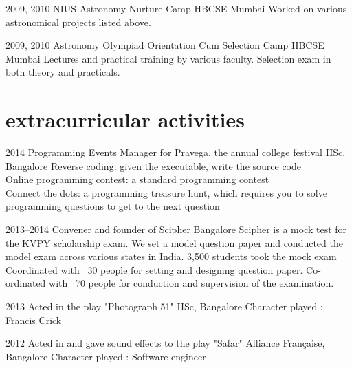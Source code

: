 \documentclass[11pt]{friggeri-cv}
\begin{document}
\begin{entrylist}
  \entryy
    {2009, 2010}
    {NIUS Astronomy Nurture Camp}
    {HBCSE Mumbai}
    {Worked on various astronomical projects listed above.}
\end{entrylist}



\begin{entrylist}
  \entryy
    {2009, 2010}
    {Astronomy Olympiad Orientation Cum Selection Camp}
    {HBCSE Mumbai}
    {Lectures and practical training by various faculty. Selection exam in both theory and practicals.}
\end{entrylist}
\pagebreak
\section{extracurricular activities}

\begin{entrylist}
  \entryy
    {2014}
    {Programming Events Manager for Pravega, the annual college festival}
    {IISc, Bangalore}
    {Reverse coding: given the executable, write the source code \\ Online programming contest: a standard programming contest\\ Connect the dots: a programming treasure hunt, which requires you to solve programming questions to get to the next question}
\end{entrylist}

\begin{entrylist}
  \entryy
    {2013--2014}
    {Convener and founder of Scipher}
    {Bangalore}
    {Scipher is a mock test for the KVPY scholarship exam. We set a model question paper and conducted the model exam across various states in India. 3,500 students took the mock exam Coordinated with ~30 people for setting and designing question paper. Co-ordinated with ~70 people for conduction and supervision of the examination. }
\end{entrylist}


\begin{entrylist}
  \entryy
    {2013}
    {Acted in the play "Photograph 51"}
    {IISc, Bangalore}
    {Character played : Francis Crick}
\end{entrylist}

\begin{entrylist}
  \entryy
    {2012}
    {Acted in and gave sound effects to the play "Safar"}
    {Alliance Française, Bangalore}
    {Character played : Software engineer}
\end{entrylist}
\end{document}
